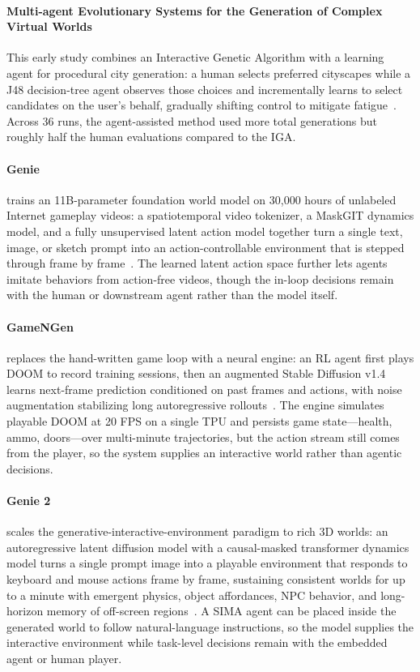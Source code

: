 \paragraph{Multi-agent Evolutionary Systems for the Generation of Complex Virtual Worlds}
This early study combines an Interactive Genetic Algorithm with a learning agent for procedural city generation: a human selects preferred cityscapes while a J48 decision-tree agent observes those choices and incrementally learns to select candidates on the user's behalf, gradually shifting control to mitigate fatigue~\cite{avg160405792}. Across 36 runs, the agent-assisted method used more total generations but roughly half the human evaluations compared to the IGA. 


\paragraph{Genie} trains an 11B-parameter foundation world model on 30,000 hours of unlabeled Internet gameplay videos: a spatiotemporal video tokenizer, a MaskGIT dynamics model, and a fully unsupervised latent action model together turn a single text, image, or sketch prompt into an action-controllable environment that is stepped through frame by frame~\cite{avg240215391}. The learned latent action space further lets agents imitate behaviors from action-free videos, though the in-loop decisions remain with the human or downstream agent rather than the model itself.

\paragraph{GameNGen} replaces the hand-written game loop with a neural engine: an RL agent first plays DOOM to record training sessions, then an augmented Stable Diffusion v1.4 learns next-frame prediction conditioned on past frames and actions, with noise augmentation stabilizing long autoregressive rollouts~\cite{valevski2024gamengen}. The engine simulates playable DOOM at 20 FPS on a single TPU and persists game state---health, ammo, doors---over multi-minute trajectories, but the action stream still comes from the player, so the system supplies an interactive world rather than agentic decisions.

\paragraph{Genie 2} scales the generative-interactive-environment paradigm to rich 3D worlds: an autoregressive latent diffusion model with a causal-masked transformer dynamics model turns a single prompt image into a playable environment that responds to keyboard and mouse actions frame by frame, sustaining consistent worlds for up to a minute with emergent physics, object affordances, NPC behavior, and long-horizon memory of off-screen regions~\cite{parkerholder2024genie2}. A SIMA agent can be placed inside the generated world to follow natural-language instructions, so the model supplies the interactive environment while task-level decisions remain with the embedded agent or human player.

